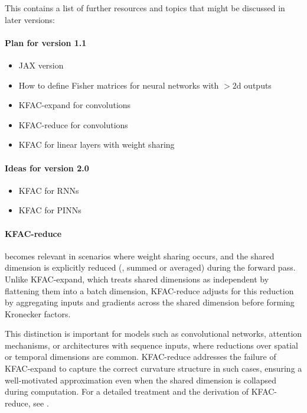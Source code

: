 This contains a list of further resources and topics that might be discussed in later versions:

\paragraph{Plan for version 1.1}
\begin{itemize}
\item JAX version
\item How to define Fisher matrices for neural networks with $>2$d outputs
\item KFAC-expand for convolutions \cite{grosse2016kroneckerfactored}
\item KFAC-reduce for convolutions \cite{eschenhagen2023kroneckerfactored}
\item KFAC for linear layers with weight sharing \cite{eschenhagen2023kroneckerfactored}
\end{itemize}

\paragraph{Ideas for version 2.0}
\begin{itemize}
  \item KFAC for RNNs \cite{martens2018kroneckerfactored}
    \item KFAC for PINNs \cite{dangel2024kroneckerfactored}
\end{itemize}

\paragraph{KFAC-reduce} becomes relevant in scenarios where weight sharing occurs, and the shared dimension is explicitly reduced (\eg, summed or averaged) during the forward pass. Unlike KFAC-expand, which treats shared dimensions as independent by flattening them into a batch dimension, KFAC-reduce adjusts for this reduction by aggregating inputs and gradients across the shared dimension before forming Kronecker factors.

This distinction is important for models such as convolutional networks, attention mechanisms, or architectures with sequence inputs, where reductions over spatial or temporal dimensions are common. KFAC-reduce addresses the failure of KFAC-expand to capture the correct curvature structure in such cases, ensuring a well-motivated approximation even when the shared dimension is collapsed during computation. For a detailed treatment and the derivation of KFAC-reduce, see \citet{eschenhagen2023kroneckerfactored}.
